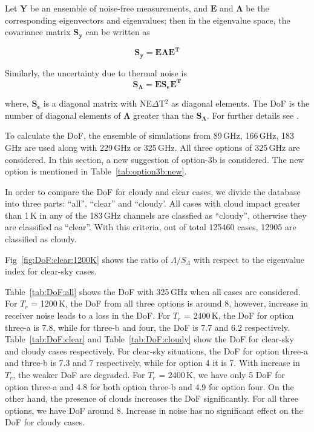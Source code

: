 \documentclass[12pt]{article}
\begin{document}
Let $\mathbf{Y}$ be an ensemble of noise-free measurements, and $\textbf{E}$ and $\mathbf{\Lambda}$ be the corresponding eigenvectors and eigenvalues; then in the eigenvalue space, the covariance matrix $\mathbf{S_y}$ can be written as

\begin{equation}
\mathbf{S_y = E \Lambda E^T} 
\end{equation}

Similarly, the uncertainty due to thermal noise is
\begin{equation}
\mathbf{S_{\Lambda} = E S_{\epsilon} E^T }
\end{equation}

where, $\mathbf{S_{\epsilon}}$ is a diagonal matrix with NE$\Delta$T$^2$ as diagonal elements. The DoF is the number of diagonal elements of $\mathbf{\Lambda}$ greater than the $\mathbf{S_\Lambda}$. For further details see \citet{eriksson:towar:20}.

To calculate the DoF, the ensemble of simulations from 89\,GHz, 166\,GHz, 183\,GHz are used along with 229\,GHz or 325\,GHz. All three options of 325\,GHz are considered. In this section, a new suggestion of option-3b is considered. The new option is mentioned in Table~\ref{tab:option3b:new}.

In order to compare the DoF for cloudy and clear cases, we divide the database into three parts: ``all'', ``clear'' and ``cloudy'. All cases with cloud impact greater than 1\,K in any of the 183\,GHz channels are classfied as ``cloudy'', otherwise they are classified as ``clear''. With this criteria, out of total 125460 cases, 12905 are classified as cloudy.  

Fig~\ref{fig:DoF:clear:1200K} shows the ratio of $\Lambda/S_\Lambda$ with respect to the eigenvalue index for clear-sky cases. 


 
Table~\ref{tab:DoF:all} shows the DoF with 325\,GHz when all cases are considered. For $T_r$ = 1200\,K, the DoF from all three options is around 8, however, increase in receiver noise leads to a loss in the DoF. For $T_r$ = 2400\,K, the DoF for option three-a is 7.8, while for three-b and four, the DoF is 7.7 and 6.2 respectively. Table~\ref{tab:DoF:clear} and Table~\ref{tab:DoF:cloudy} show the DoF for clear-sky and cloudy cases respectively. For clear-sky situations, the DoF for option three-a and three-b is 7.3 and 7 respectively, while for option 4 it is 7. With increase in $T_r$, the weaker DoF are degraded. For $T_r$ = 2400\,K, we have only 5 DoF for option three-a and 4.8 for both option three-b and 4.9 for option four. On the other hand, the presence of clouds increases the DoF significantly. For all three options, we have DoF around 8. Increase in noise has no significant effect on the DoF for cloudy cases. 
\end{document}
